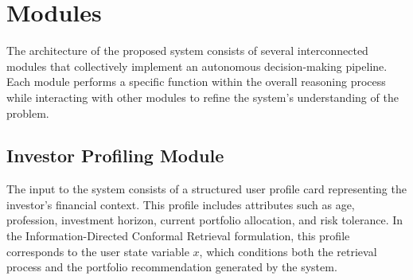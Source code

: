\documentclass[12pt,a4paper,oneside]{report}
\theoremstyle{definition}
\theoremstyle{remark}
\begin{document}
\section{Modules}

The architecture of the proposed system consists of several interconnected modules that collectively implement an autonomous decision-making pipeline. Each module performs a specific function within the overall reasoning process while interacting with other modules to refine the system's understanding of the problem.

\subsection{Investor Profiling Module}
The input to the system consists of a structured user profile card representing the investor's financial context. This profile includes attributes such as age, profession, investment horizon, current portfolio allocation, and risk tolerance. In the Information-Directed Conformal Retrieval formulation, this profile corresponds to the user state variable $x$, which conditions both the retrieval process and the portfolio recommendation generated by the system.
\end{document}
